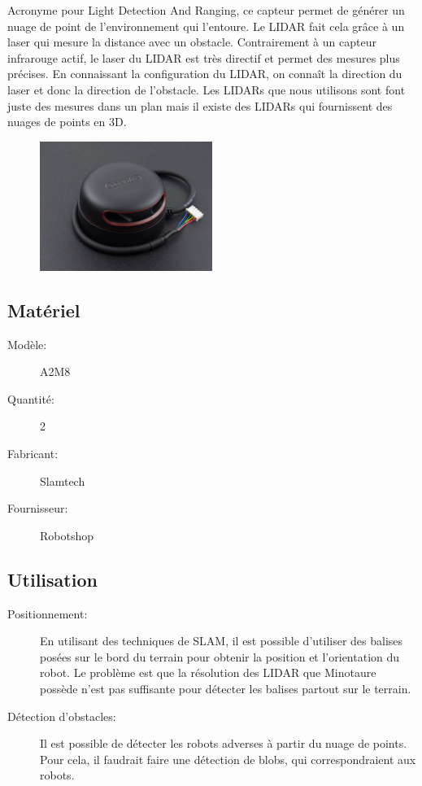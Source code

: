 \documentclass[a4paper, 11pt]{report}
\begin{document}
Acronyme pour Light Detection And Ranging, ce capteur permet de générer un nuage de point de l'environnement qui l'entoure. Le LIDAR fait cela grâce à un laser qui mesure la distance avec un obstacle. Contrairement à un capteur infrarouge actif, le laser du LIDAR est très directif et permet des mesures plus précises. En connaissant la configuration du LIDAR, on connaît la direction du laser et donc la direction de l'obstacle. Les LIDARs que nous utilisons sont font juste des mesures dans un plan mais il existe des LIDARs qui fournissent des nuages de points en 3D.

\begin{figure}[h]
\begin{centering}
\includegraphics[width=0.5\textwidth]{images/RPLidar.jpg}
\par\end{centering}
\end{figure}

\subsection{Matériel}
\begin{description}
\item[Modèle:] A2M8
\item[Quantité:]2
\item[Fabricant:]Slamtech
\item[Fournisseur:]Robotshop
\end{description}


\subsection{Utilisation}
\begin{description}
\item[Positionnement:]En utilisant des techniques de SLAM, il est possible d'utiliser des balises posées sur le bord du terrain pour obtenir la position et l'orientation du robot. Le problème est que la résolution des LIDAR que Minotaure possède n'est pas suffisante pour détecter les balises partout sur le terrain.
\item[Détection d'obstacles:] Il est possible de détecter les robots adverses à partir du nuage de points. Pour cela, il faudrait faire une détection de blobs, qui correspondraient aux robots.
\end{description}
\end{document}
